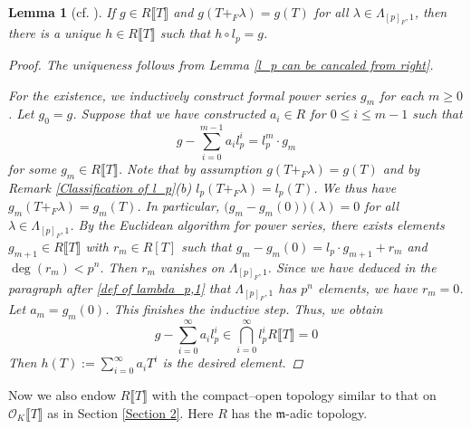 \documentclass[12pt]{article}
\newtheorem{lemma}[theorem]{Lemma}
\theoremstyle{definition}
\newcommand{\PS}[1]{\llbracket #1 \rrbracket}
\def\m{\mathfrak{m}}
\def\O{\mathcal{O}}
\begin{document}
    \begin{lemma}[{{cf. \cite[Lemma 3]{Col79}}}] \label{Lemma for CN}
        If $g \in R\PS{T}$ and $g(T +_F \lambda) = g(T)$ for all $\lambda \in \Lambda_{[p]_F,1}$, then there is a unique $h \in R\PS{T}$ such that $h \circ l_p = g$. 
        \begin{proof}
            The uniqueness follows from Lemma \ref{l_p can be cancaled from right}. \par 
            For the existence, we inductively construct formal power series $g_m$ for each $m \geqslant 0$. Let $g_0 = g$. Suppose that we have constructed $a_i \in R$ for $0 \leqslant i \leqslant m - 1$ such that 
            \begin{equation*}
                g - \sum_{i = 0}^{m - 1} a_il_p^i = l_p^m \cdot g_m
            \end{equation*}
            for some $g_m \in R\PS{T}$. Note that by assumption $g(T +_F \lambda) = g(T)$ and by Remark \ref{Classification of l_p}(b) $l_p(T +_F \lambda) = l_p(T)$. We thus have $g_m(T +_F \lambda) = g_m(T)$. In particular, $\bigl(g_m -g_m(0)\bigr)(\lambda) = 0$ for all $\lambda \in \Lambda_{[p]_F,1}$. By the Euclidean algorithm for power series, there exists elements $g_{m+1} \in R\PS{T}$ with $r_m \in R[T]$ such that $g_m - g_m(0) = l_p \cdot g_{m+1} + r_m$ and $\deg(r_m) < p^n$. Then $r_m$ vanishes on $\Lambda_{[p]_F,1}$. Since we have deduced in the paragraph after \eqref{def of lambda_p,1} that $\Lambda_{[p]_F,1}$ has $p^n$ elements, we have $r_m = 0$. Let $a_m = g_m(0)$. This finishes the inductive step. Thus, we obtain 
            \begin{equation*}
                g - \sum_{i = 0}^\infty a_il_p^i \in \bigcap_{i = 0}^\infty l_p^i R\PS{T} = 0
            \end{equation*}
            Then $h(T) := \sum_{i = 0}^\infty a_i T^i$ is the desired element. 
        \end{proof}
    \end{lemma}
    Now we also endow $R\PS{T}$ with the compact--open topology similar to that on $\O_K\PS{T}$ as in Section \ref{Section 2}. Here $R$ has the $\m$-adic topology. 
\end{document}

